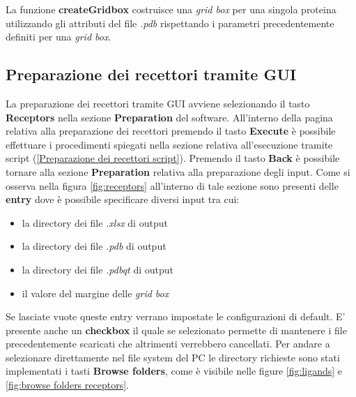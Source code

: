 La funzione \textbf{createGridbox} costruisce una \textit{grid box} per una singola proteina utilizzando gli attributi del file \textit{.pdb} rispettando i parametri precedentemente definiti per una \textit{grid box}.

\subsection{Preparazione dei recettori tramite GUI}
La preparazione dei recettori tramite GUI avviene selezionando il tasto \textbf{Receptors} nella sezione \textbf{Preparation} del software. All'interno della pagina relativa alla preparazione dei recettori premendo il tasto \textbf{Execute} è possibile effettuare i procedimenti spiegati nella sezione relativa all'esecuzione tramite script (\ref{Preparazione dei recettori script}). Premendo il tasto \textbf{Back} è possibile tornare alla sezione \textbf{Preparation} relativa alla preparazione degli input.
Come si osserva nella figura \ref{fig:receptors} all'interno di tale sezione sono presenti delle \textbf{entry} dove è possibile specificare diversi input tra cui:

\begin{itemize}
    \item la directory dei file \textit{.xlsx} di output
    \item la directory dei file \textit{.pdb} di output
    \item la directory dei file \textit{.pdbqt} di output
    \item il valore del margine delle \textit{grid box}
\end{itemize}

Se lasciate vuote queste entry verrano impostate le configurazioni di default. E' presente anche un \textbf{checkbox} il quale se selezionato permette di mantenere i file precedentemente scaricati che altrimenti verrebbero cancellati.\newline
Per andare a selezionare direttamente nel file system del PC le directory richieste sono stati implementati i tasti \textbf{Browse folders}, come è visibile nelle figure \ref{fig:ligands} e \ref{fig:browse folders receptors}.

